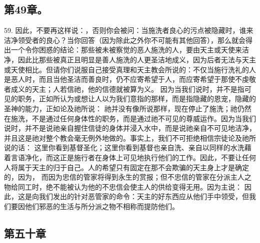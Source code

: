 
\subsection{第49章。}

59. 因此，不要再这样说：，否则你会被问：当施洗者良心的污点被隐藏时，谁来洁净领受者的良心？当你回答（因为除此之外你不可能有其他回答），那么就会得出一个令你困惑的结论：那些被未被察觉的恶人施洗的人，要由天主或天使来洁净，因此比那些被真正且明显是善人施洗的人更圣洁地成义，因为后者无法与天主或天使相比。但请你们说服自己接受真理和天主教会所说的：不仅当施行洗礼的人是恶人时，而且当他圣洁而善良时，仍不应寄希望于人，而应寄希望于那使不虔敬者成义的天主；人若信祂，他的信德就被算为义。 因为当我们说时，并不是指可见的职务，正如所认为或想让人以为我们意指的那样，而是指隐藏的恩宠，隐藏的圣神的能力，正如论及祂所说： 祂并没有像所说那样，现在停止了施洗；祂仍然在施洗，不是通过任何身体性的职务，而是通过祂不可见的尊威运作。因为当我们说时，并不是说祂亲自握住信徒的身体并浸入水中，而是说祂亲自不可见地洁净，并且这是祂对整个教会毫无例外地做的。事实上，我们不可拒绝相信宗徒论及祂所说的话： 这里你看到基督圣化；这里你看到基督也亲自洗、亲自以同样的水洗藉着言语净化，而这正是施行者在身体上可见地执行他们的工作。因此，不要让任何人将属于天主的归于自己。人的希望只有固定在那不会欺骗的天主身上才是确定的，因为， 而因为忠信的管家将得到永生的赏报；但不忠信的管家在分派主人之物给同工时，绝不能被认为他的不忠信会使主人的供给变得无用。因为主说： 因此，这是向我们发出的针对恶管家的命令：天主的好东西应从他们手中领受，但我们要因他们邪恶的生活与所分派之物不相称而提防他们。\par


\subsection{第五十章}

